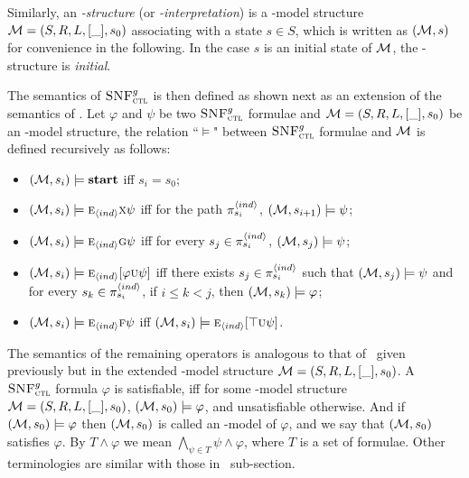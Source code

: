 \documentclass{article}
\begin{document}
Similarly, an {\em \Ind-structure} (or {\em \Ind-interpretation}) is a \Ind-model structure
${\cal M}=(S, R, L, [\_], s_0)$ associating
with a state $s\in S$, which is written as $({\cal M},s)$ for convenience in the following.
In the case $s$ is an initial state of $\cal M$, the \Ind-structure is {\em initial}.

The semantics of ${\textsc{SNF}_{\textsc{ctl}}^g}$ is then
defined as shown next as an extension of the semantics of \CTL. Let $\varphi$ and $\psi$ be two ${\textsc{SNF}_{\textsc{ctl}}^g}$ formulae and ${\cal M}=(S,R,L,[\_],s_0)$ be an \Ind-model structure, the relation ``$\models$" between ${\textsc{SNF}_{\textsc{ctl}}^g}$ formulae and ${\cal M}$ is defined recursively as follows:
\begin{itemize}
  \item $({\cal M},s_i) \models \textbf{start}$ iff $s_i=s_0$;
  \item $({\cal M},s_i)\models \textsc{e}_{{\langle{ind}\rangle}} \textsc{x} \psi$ iff for the path $\pi_{s_i}^{{\langle{ind}\rangle}}$, $({\cal M}, s_{i+1})\models \psi$;
  \item $({\cal M},s_i)\models \textsc{e}_{{\langle{ind}\rangle}}\textsc{g}\psi$ iff
    for every $s_j \in \pi_{s_i}^{{\langle{ind}\rangle}}$,
    $({\cal M},s_j) \models \psi$;
  \item $({\cal M},s_i)\models \textsc{e}_{{\langle{ind}\rangle}}[\varphi\textsc{u}\psi]$ iff
      there exists $s_j\in \pi_{s_i}^{{\langle{ind}\rangle}}$ such that $({\cal M},s_j) \models \psi$ and for every $s_k \in \pi_{s_i}^{{\langle{ind}\rangle}}$, if $i\leq k < j$, then $({\cal M},s_k) \models \varphi$;
  \item $({\cal M},s_i) \models \textsc{e}_{{\langle{ind}\rangle}} \textsc{f} \psi$ iff $({\cal M},s_i) \models \textsc{e}_{{\langle{ind}\rangle}}[\top \textsc{u}\psi]$.
\end{itemize}
The semantics of the remaining operators is analogous to that of \CTL\ given previously but in the
extended \Ind-model structure ${\cal M}=(S, R, L, [\_],s_0)$.
A ${\textsc{SNF}_{\textsc{ctl}}^g}$ formula $\varphi$ is satisfiable, iff for some \Ind-model structure ${\cal M}=(S,R,L,[\_],s_0)$, $({\cal M},s_0)\models \varphi$, and unsatisfiable otherwise. And if $({\cal M},s_0)\models \varphi$ then $({\cal M},s_0)$ is called an \Ind-model of $\varphi$, and we say that $({\cal M},s_0)$ satisfies $\varphi$.
By $T \wedge \varphi$ we mean $\bigwedge_{\psi\in T} \psi \wedge \varphi$, where $T$ is a set of formulae.
Other terminologies are similar with those in \CTL\ sub-section.
\end{document}
